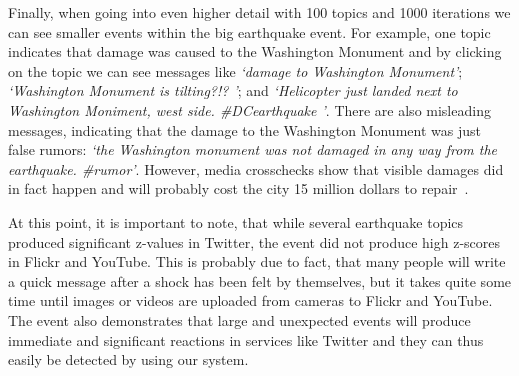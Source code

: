 Finally, when going into even higher detail with 100 topics and 1000 iterations we can see smaller events within the big earthquake event. For example, one topic indicates that damage was caused to the Washington Monument and by clicking on the topic we can see messages like \textit{\textquoteleft damage to Washington Monument\textquoteright}; \textit{\textquoteleft Washington Monument is tilting?!? \textquoteright}; and \textit{\textquoteleft Helicopter just landed next to Washington Moniment, west side. \#DCearthquake \textquoteright}. There are also misleading messages, indicating that the damage to the Washington Monument was just false rumors: \textit{\textquoteleft the Washington monument was not damaged in any way from the earthquake. \#rumor\textquoteright}. However, media crosschecks show that visible damages did in fact happen and will probably cost the city 15 million dollars to repair~\cite{Huffingtonpost:2012:Web}.

At this point, it is important to note, that while several earthquake topics produced significant z-values in Twitter, the event did not produce high z-scores in Flickr and YouTube.
This is probably due to fact, that many people will write a quick message after a shock has been felt by themselves, but it takes quite some time until images or videos are uploaded from cameras to Flickr and YouTube. The event also demonstrates that large and unexpected events will produce immediate and significant reactions in services like Twitter and they can thus easily be detected by using our system.
